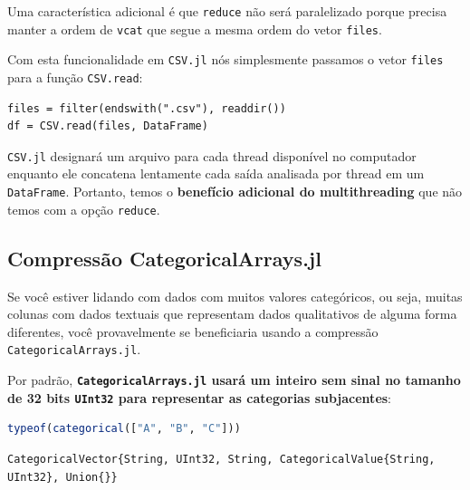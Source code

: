 \documentclass[
  notoc %
]{tufte-book}
\newcommand{\passthrough}[1]{#1}
\begin{document}
Uma característica adicional é que \passthrough{\lstinline!reduce!} não
será paralelizado porque precisa manter a ordem de
\passthrough{\lstinline!vcat!} que segue a mesma ordem do vetor
\passthrough{\lstinline!files!}.

Com esta funcionalidade em \passthrough{\lstinline!CSV.jl!} nós
simplesmente passamos o vetor \passthrough{\lstinline!files!} para a
função \passthrough{\lstinline!CSV.read!}:

\begin{lstlisting}
files = filter(endswith(".csv"), readdir())
df = CSV.read(files, DataFrame)
\end{lstlisting}

\passthrough{\lstinline!CSV.jl!} designará um arquivo para cada thread
disponível no computador enquanto ele concatena lentamente cada saída
analisada por thread em um \passthrough{\lstinline!DataFrame!}.
Portanto, temos o \textbf{benefício adicional do multithreading} que não
temos com a opção \passthrough{\lstinline!reduce!}.

\hypertarget{sec:df_performance_categorical_compression}{%
\subsection{Compressão
CategoricalArrays.jl}\label{sec:df_performance_categorical_compression}}

Se você estiver lidando com dados com muitos valores categóricos, ou
seja, muitas colunas com dados textuais que representam dados
qualitativos de alguma forma diferentes, você provavelmente se
beneficiaria usando a compressão
\passthrough{\lstinline!CategoricalArrays.jl!}.

Por padrão, \textbf{\passthrough{\lstinline!CategoricalArrays.jl!} usará
um inteiro sem sinal no tamanho de 32 bits
\passthrough{\lstinline!UInt32!} para representar as categorias
subjacentes}:

\begin{lstlisting}[language=Julia]
typeof(categorical(["A", "B", "C"]))
\end{lstlisting}

\begin{lstlisting}
CategoricalVector{String, UInt32, String, CategoricalValue{String, UInt32}, Union{}}
\end{lstlisting}
\end{document}
